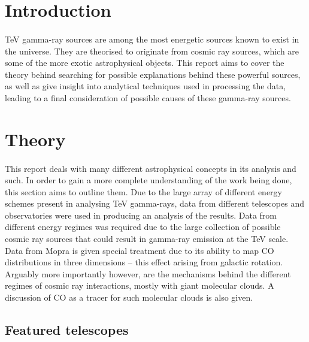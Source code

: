 \documentclass[a4paper, titlepage, oneside]{article}
\begin{document}
\begin{multicols}{2}
\section{Introduction}
\paragraph{}
TeV gamma-ray sources are among the most energetic sources known to exist in the universe. They are theorised to originate from cosmic ray sources, which are some of the more exotic astrophysical objects. This report aims to cover the theory behind searching for possible explanations behind these powerful sources, as well as give insight into analytical techniques used in processing the data, leading to a final consideration of possible causes of these gamma-ray sources.

\section{Theory}
\paragraph{}
This report deals with many different astrophysical concepts in its analysis and such. In order to gain a more complete understanding of the work being done, this section aims to outline them. Due to the large array of different energy schemes present in analysing TeV gamma-rays, data from different telescopes and observatories were used in producing an analysis of the results. Data from different energy regimes was required due to the large collection of possible cosmic ray sources that could result in gamma-ray emission at the TeV scale. Data from Mopra is given special treatment due to its ability to map CO distributions in three dimensions -- this effect arising from galactic rotation. Arguably more importantly however, are the mechanisms behind the different regimes of cosmic ray interactions, mostly with giant molecular clouds. A discussion of CO as a tracer for such molecular clouds is also given.

\subsection{Featured telescopes}

\end{multicols}
\end{document}
